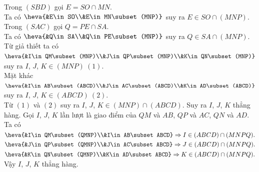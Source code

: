 \begin{ex}
{		\begin{itemchoice}
			\itemch  Trong $(SBD)$ gọi $E= SO\cap MN$.\\
			Ta có  $\heva{&E\in SO\\&E\in MN\subset(MNP)}$ suy ra $E\in SO\cap(MNP)$.
			\itemch Trong  $(SAC)$ gọi $Q=PE\cap SA$.\\
			Ta có $\heva{&Q\in SA\\&Q\in PE\subset(MNP)}$  suy ra $Q\in SA\cap(MNP)$.
			\itemch Từ giả thiết ta có $\heva{&I\in QM\subset(MNP)\\&J\in QP\subset(MNP)\\&K\in QN\subset(MNP)}$ suy ra $I$, $J$, $K\in(MNP)\  (1)$.\\
			Mặt khác $\heva{&I\in AB\subset(ABCD)\\&J\in AC\subset(ABCD)\\&K\in AD\subset(ABCD)}$ suy ra $I$, $J$,  $K\in(ABCD)\ (2)$.\\
			Từ $(1)$ và $(2)$ suy ra $I$, $J$, $K\in(MNP)\cap(ABCD)$. Suy ra $I$, $J$,  $K$ thẳng hàng.
			\itemch Gọi $I$, $J$, $K$ lần  lượt là giao điểm của $QM$ và $AB$, $QP$ và $AC$, $QN$ và $AD$.\\
			Ta  có $\heva{&I\in QM\subset (QMNP)\\&I\in AB\subset ABCD} \Rightarrow I\in (ABCD)\cap (MNPQ).
			 $\\
			$\heva{&J\in QP\subset (QMNP)\\&J\in AC\subset ABCD} \Rightarrow J\in (ABCD)\cap (MNPQ). 
			 $\\
			$\heva{&K\in QN\subset (QMNP)\\&K\in AD\subset  ABCD} \Rightarrow K\in (ABCD)\cap (MNPQ).
			 $\\
			Vậy $I$, $J$, $K$ thẳng hàng. 
		\end{itemchoice}
	 }
\end{ex}



